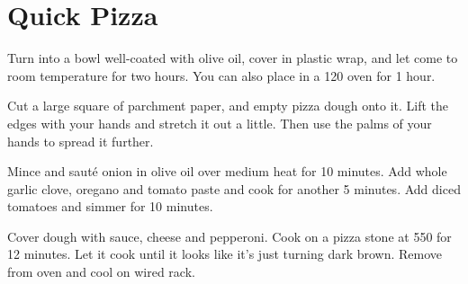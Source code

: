 \section{Quick Pizza}
\begin{recipe}



Turn into a bowl well-coated with olive oil, cover in plastic wrap, and let
come to room temperature for two hours. You can also place in a 120\degree{} oven
for 1 hour.

Cut a large square of parchment paper, and empty pizza dough onto it. Lift the
edges with your hands and stretch it out a little. Then use the palms of your
hands to spread it further.


Mince and sauté onion in olive oil over medium heat for 10 minutes. Add whole
garlic clove, oregano and tomato paste and cook for another 5 minutes. Add
diced tomatoes and simmer for 10 minutes.


Cover dough with sauce, cheese and pepperoni. Cook on a pizza stone at 550\degree{} for 12 minutes.
Let it cook until it looks like it's just turning dark brown. Remove from oven
and cool on wired rack.


\end{recipe}
